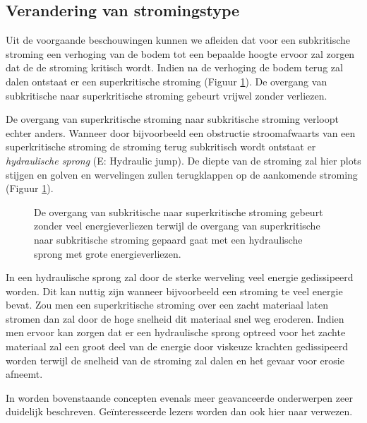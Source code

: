 	\subsection{Verandering van stromingstype}
Uit de voorgaande beschouwingen kunnen we afleiden dat voor een subkritische stroming een verhoging van de bodem tot een bepaalde hoogte ervoor zal zorgen dat de de stroming kritisch wordt. Indien na de verhoging de bodem terug zal dalen ontstaat er een superkritische stroming (Figuur \ref{fig:Open_kanaal_subkritisch_naar_superkritisch}). De overgang van subkritische naar superkritische stroming gebeurt vrijwel zonder verliezen.

De overgang van superkritische stroming naar subkritische stroming verloopt echter anders. Wanneer door bijvoorbeeld een obstructie stroomafwaarts van een superkritische stroming de stroming terug subkritisch wordt ontstaat er \emph{hydraulische sprong} (E: Hydraulic jump). De diepte van de stroming zal hier plots stijgen en golven en wervelingen zullen terugklappen op de aankomende stroming (Figuur \ref{fig:Open_kanaal_subkritisch_naar_superkritisch}). 
\begin{figure}[htb]
	\centering
	
	\caption{De overgang van subkritische naar superkritische stroming gebeurt zonder veel energieverliezen terwijl de overgang van superkritische naar subkritische stroming gepaard gaat met een hydraulische sprong met grote energieverliezen.}
	\label{fig:Open_kanaal_subkritisch_naar_superkritisch}
\end{figure}

In een hydraulische sprong zal door de sterke werveling veel energie gedissipeerd worden. Dit kan nuttig zijn wanneer bijvoorbeeld een stroming te veel energie bevat. Zou men een superkritische stroming over een zacht materiaal laten stromen dan zal door de hoge snelheid dit materiaal snel weg eroderen. Indien men ervoor kan zorgen dat er een hydraulische sprong optreed voor het zachte materiaal zal een groot deel van de energie door viskeuze krachten gedissipeerd worden terwijl de snelheid van de stroming zal dalen en het gevaar voor erosie afneemt.
	
In \cite{Chaudhry2007} worden bovenstaande concepten evenals meer geavanceerde onderwerpen zeer duidelijk beschreven. Geïnteresseerde lezers worden dan ook hier naar verwezen.